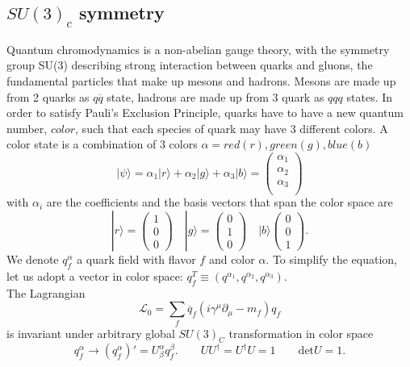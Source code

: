 \documentclass{report}
\numberwithin{equation}{section}
\begin{document}
\subsection{$SU(3)_c$ symmetry}
Quantum chromodynamics is a non-abelian gauge theory, with the symmetry group SU(3) describing strong interaction between quarks and gluons, the fundamental particles that make up mesons and hadrons. Mesons are made up from 2 quarks as $q\overline{q}$ state, hadrons are made up from 3 quark as $qqq$ states. In order to satisfy Pauli's Exclusion Principle, quarks have to have a new quantum number, $color$, such that each species of quark may have 3 different colors.
A color state is a combination of 3 colors $\alpha= red(r), green(g), blue(b)$
\begin{equation}
|\psi \rangle = \alpha_1 |r\rangle +\alpha_2 |g\rangle+ \alpha_3 |b\rangle=\begin{pmatrix}
\alpha_1\\\alpha_2\\\alpha_3\\
\end{pmatrix}
\end{equation}
with $\alpha_i$ are the coefficients and the basis vectors that span the color space are
\begin{equation}
|r\rangle=\begin{pmatrix}
1\\0\\0
\end{pmatrix}\quad |g\rangle=\begin{pmatrix}
0\\1\\0
\end{pmatrix}\quad |b\rangle \begin{pmatrix}
0\\0\\1
\end{pmatrix}.
\end{equation}
We denote $q_f^\alpha$ a quark field with flavor $f$ and color $\alpha$. To simplify the equation, let us adopt a vector in color space: $q^T_f \equiv (q^{\alpha_1},q^{\alpha_2},q^{\alpha_3})$.\\
The  Lagrangian 
\begin{equation}
\mathcal{L}_0=\sum_f \overline{q}_f(i\gamma^\mu \partial_\mu-m_f)q_f
\end{equation} 
is invariant under arbitrary global $SU(3)_C$ transformation in color space
\begin{equation}
q^\alpha_f \xrightarrow{} (q_f^\alpha)'= U^\alpha_\beta q^\beta_f. \quad\quad UU^\dagger= U^\dagger U = 1 \quad\quad \text{det}U=1.
\end{equation}
\end{document}
